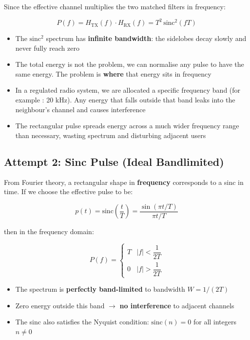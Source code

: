 Since the effective channel multiplies the two matched filters in frequency:

\begin{equation}
P(f) = H_{\text{TX}}(f) \cdot H_{\text{RX}}(f) = T^2\,\mathrm{sinc}^2(fT)
\end{equation}

\begin{itemize}
\item The $\mathrm{sinc}^2$ spectrum has \textbf{infinite bandwidth}: the sidelobes decay slowly and never fully reach zero
\item The total energy is not the problem, we can normalise any pulse to have the same energy. The problem is \textbf{where} that energy sits in frequency
\item In a regulated radio system, we are allocated a specific frequency band (for example : 20 kHz). Any energy that falls outside that band leaks into the neighbour's channel and causes interference
\item The rectangular pulse spreads energy across a much wider frequency range than necessary, wasting spectrum and disturbing adjacent users
\end{itemize}

\subsection{Attempt 2: Sinc Pulse (Ideal Bandlimited)}

From Fourier theory, a rectangular shape in \textbf{frequency} corresponds to a sinc in time. If we choose the effective pulse to be:

\begin{equation}
p(t) = \mathrm{sinc}\!\left(\frac{t}{T}\right) = \frac{\sin(\pi t / T)}{\pi t / T}
\end{equation}

then in the frequency domain:

\begin{equation}
P(f) = \begin{cases} T & |f| < \dfrac{1}{2T} \\[0.5em] 0 & |f| > \dfrac{1}{2T} \end{cases}
\end{equation}

\begin{itemize}
\item The spectrum is \textbf{perfectly band-limited} to bandwidth $W = 1/(2T)$
\item Zero energy outside this band $\rightarrow$ \textbf{no interference} to adjacent channels
\item The sinc also satisfies the Nyquist condition: $\mathrm{sinc}(n) = 0$ for all integers $n \neq 0$
\end{itemize}

